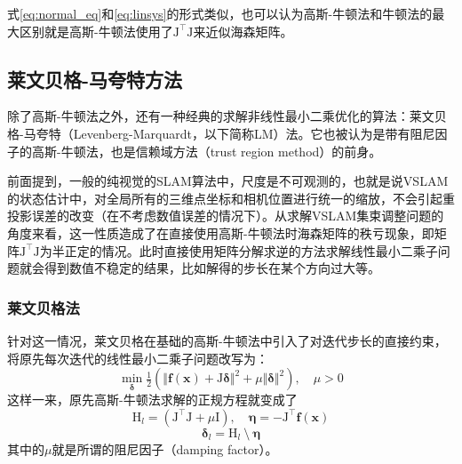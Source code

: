 式\eqref{eq:normal_eq}和\eqref{eq:linsys}的形式类似，也可以认为高斯-牛顿法和牛顿法的最大区别就是高斯-牛顿法使用了$\mathrm{J}^\top\mathrm{J}$来近似海森矩阵。

\subsection{莱文贝格-马夸特方法}

除了高斯-牛顿法之外，还有一种经典的求解非线性最小二乘优化的算法：莱文贝格-马夸特（Levenberg-Marquardt，以下简称LM）法。它也被认为是带有阻尼因子的高斯-牛顿法，也是信赖域方法（trust region method）的前身\citep{jorge2006numerical}。

前面提到，一般的纯视觉的SLAM算法中，尺度是不可观测的，也就是说VSLAM的状态估计中，对全局所有的三维点坐标和相机位置进行统一的缩放，不会引起重投影误差的改变（在不考虑数值误差的情况下）。从求解VSLAM集束调整问题的角度来看，这一性质造成了在直接使用高斯-牛顿法时海森矩阵的秩亏现象，即矩阵$\mathrm{J}^\top\mathrm{J}$为半正定的情况。此时直接使用矩阵分解求逆的方法求解线性最小二乘子问题就会得到数值不稳定的结果，比如解得的步长在某个方向过大等。

\subsubsection*{莱文贝格法}

针对这一情况，莱文贝格在基础的高斯-牛顿法中引入了对迭代步长的直接约束，将原先每次迭代的线性最小二乘子问题改写为：
\begin{equation}
    \mathop{\min}_{\bm{\delta}} \tfrac{1}{2}
    \left(
        \Vert \bm{f}(\bm{x}) + \mathrm{J}\bm{\delta} \Vert^2 +
        \mu \Vert \bm{\delta} \Vert^2
    \right), \quad \mu > 0
\end{equation}
这样一来，原先高斯-牛顿法求解的正规方程就变成了
\begin{equation}
    \mathrm{H}_{l} = \left( \mathrm{J}^\top\mathrm{J}+\mu\mathrm{I} \right), \quad
    \bm{\eta}      = -\mathrm{J}^\top\bm{f}(\bm{x})
\end{equation}
\begin{equation}
    \bm{\delta}_{l} = \mathrm{H}_{l} \:\setminus\: \bm{\eta}
    \label{eq:levenberg}
\end{equation}
其中的$\mu$就是所谓的阻尼因子（damping factor）。

